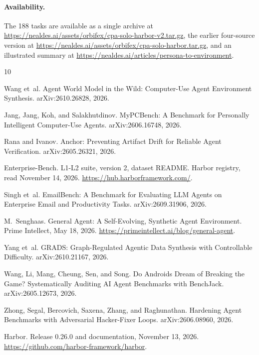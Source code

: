 \documentclass{article}
\begin{document}
\paragraph{Availability.} The 188 tasks are available as a single archive at \url{https://nealdes.ai/assets/orbifex/cpa-solo-harbor-v2.tar.gz}, the earlier four-source version at \url{https://nealdes.ai/assets/orbifex/cpa-solo-harbor.tar.gz}, and an illustrated summary at \url{https://nealdes.ai/articles/persona-to-environment}.

\begin{thebibliography}{10}

Wang et~al.
\newblock Agent World Model in the Wild: Computer-Use Agent Environment Synthesis.
\newblock arXiv:2610.26828, 2026.

Jang, Jang, Koh, and Salakhutdinov.
\newblock MyPCBench: A Benchmark for Personally Intelligent Computer-Use Agents.
\newblock arXiv:2606.16748, 2026.

Rana and Ivanov.
\newblock Anchor: Preventing Artifact Drift for Reliable Agent Verification.
\newblock arXiv:2605.26321, 2026.

Enterprise-Bench.
\newblock L1-L2 suite, version 2, dataset README.
\newblock Harbor registry, read November 14, 2026. \url{https://hub.harborframework.com/}.

Singh et~al.
\newblock EmailBench: A Benchmark for Evaluating LLM Agents on Enterprise Email and Productivity Tasks.
\newblock arXiv:2609.31906, 2026.

M.~Senghaas.
\newblock General Agent: A Self-Evolving, Synthetic Agent Environment.
\newblock Prime Intellect, May 18, 2026. \url{https://primeintellect.ai/blog/general-agent}.

Yang et~al.
\newblock GRADS: Graph-Regulated Agentic Data Synthesis with Controllable Difficulty.
\newblock arXiv:2610.21167, 2026.

Wang, Li, Mang, Cheung, Sen, and Song.
\newblock Do Androids Dream of Breaking the Game? Systematically Auditing AI Agent Benchmarks with BenchJack.
\newblock arXiv:2605.12673, 2026.

Zhong, Segal, Bercovich, Saxena, Zhang, and Raghunathan.
\newblock Hardening Agent Benchmarks with Adversarial Hacker-Fixer Loops.
\newblock arXiv:2606.08960, 2026.

Harbor.
\newblock Release 0.26.0 and documentation, November 13, 2026.
\newblock \url{https://github.com/harbor-framework/harbor}.

\end{thebibliography}
\end{document}
